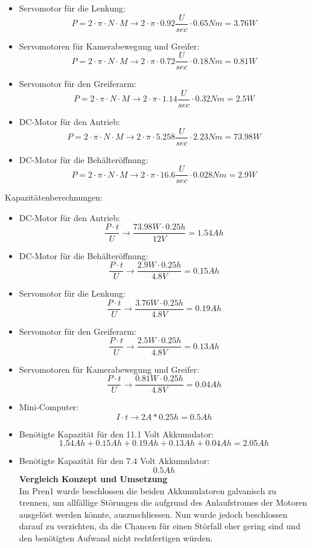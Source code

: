 \begin{itemize}
\item Servomotor für die Lenkung:
\[
P=2\cdot \pi\cdot N\cdot M \to 2\cdot \pi\cdot 0.92\frac{U}{sec}\cdot 0.65Nm = 3.76W
\]
\item Servomotoren für Kamerabewegung und Greifer:
\[
P=2\cdot \pi\cdot N\cdot M \to 2\cdot \pi\cdot 0.72\frac{U}{sec}\cdot 0.18Nm = 0.81W
\]
\item Servomotor für den Greiferarm:
\[
P=2\cdot \pi\cdot N\cdot M \to 2\cdot \pi\cdot 1.14\frac{U}{sec}\cdot 0.32Nm = 2.5W
\]
\item DC-Motor für den Antrieb:
\[
P=2\cdot \pi\cdot N\cdot M \to 2\cdot \pi\cdot 5.258\frac{U}{sec}\cdot 2.23Nm = 73.98W
\]
\item DC-Motor für die Behälteröffnung:
\[
P=2\cdot \pi\cdot N\cdot M \to 2\cdot \pi\cdot 16.6\frac{U}{sec}\cdot 0.028Nm = 2.9W
\]
\end{itemize}
\newpage
Kapazitätenberechnungen:
\begin{itemize}
\item DC-Motor für den Antrieb:
\[
\frac{P\cdot t}{U} \to \frac{73.98W\cdot0.25h}{12V}= 1.54 Ah
\]
\item DC-Motor für die Behälteröffnung:
\[
\frac{P\cdot t}{U} \to \frac{2.9W\cdot0.25h}{4.8V}= 0.15 Ah
\]
\item Servomotor für die Lenkung:
\[
\frac{P\cdot t}{U} \to \frac{3.76W\cdot0.25h}{4.8V}= 0.19 Ah
\]
\item Servomotor für den Greiferarm:
\[
\frac{P\cdot t}{U} \to \frac{2.5W\cdot0.25h}{4.8V}= 0.13 Ah
\]
\item Servomotoren für Kamerabewegung und Greifer:
\[
\frac{P\cdot t}{U} \to \frac{0.81W\cdot0.25h}{4.8V}= 0.04 Ah
\]
\item Mini-Computer:
\[
I\cdot t \to 2A*0.25h = 0.5 Ah
\]
\item Benötigte Kapazität für den 11.1 Volt Akkumulator:
\[
1.54Ah+0.15Ah+0.19Ah+0.13Ah+0.04Ah = 2.05Ah
\]
\item Benötigte Kapazität für den 7.4 Volt Akkumulator:
\[
0.5Ah
\]
\textbf{Vergleich Konzept und Umsetzung}\\[0.2cm]
Im Pren1 wurde beschlossen die beiden Akkumulatoren galvanisch zu trennen, um allfällige Störungen die aufgrund des Anlaufstromes der Motoren ausgelöst werden könnte, auszuschliessen. Nun wurde jedoch beschlossen darauf zu verzichten, da die Chancen für einen Störfall eher gering sind und den benötigten Aufwand nicht rechtfertigen würden.
\end{itemize}
